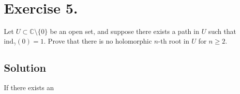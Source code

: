 \section*{Exercise 5.}

Let \( U \subset \mathbb{C} \setminus \{ 0 \} \) be an open set, and suppose there exists a path in \( U \) such that \(\mathrm{ind}_{\gamma}(0) = 1\). Prove that there is no holomorphic \(n\)-th root in \(U\) for \(n \geq 2\).

\subsection*{Solution}

If there exists an 
